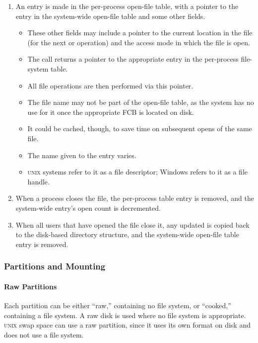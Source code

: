\begin{enumerate}[noitemsep]
\item An entry is made in the per-process open-file table, with a pointer to the entry in the system-wide open-file table and some other fields.
  \begin{itemize}[noitemsep]
  \item These other fields may include a pointer to the current location in the file (for the next  or  operation) and the access mode in which the file is open.
  \item The  call returns a pointer to the appropriate entry in the per-process file-system table.
  \item All file operations are then performed via this pointer.
  \item The file name may not be part of the open-file table, as the system has no use for it once the appropriate FCB is located on disk.
  \item It could be cached, though, to save time on subsequent opens of the same file.
  \item The name given to the entry varies.
  \item \textsc{unix} systems refer to it as a file descriptor; Windows refers to it as a file handle.
  \end{itemize}

\item When a process closes the file, the per-process table entry is removed, and
  the system-wide entry’s open count is decremented.
\item When all users that have
  opened the file close it, any updated  is copied back to the disk-based
  directory structure, and the system-wide open-file table entry is removed.
\end{enumerate}

\subsubsection{Partitions and Mounting}\label{subsubsec:Partitions_Mounting}
\paragraph{Raw Partitions}\label{par:Raw_Partitions}
Each partition can be either ``raw,'' containing no file system, or ``cooked,'' containing a file system.
A raw disk is used where no file system is appropriate.
\textsc{unix} swap space can use a raw partition, since it uses its own format on disk and does not use a file system.

